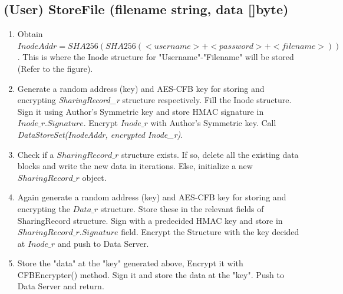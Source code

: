 \documentclass[a4paper, 12pt]{scrartcl}
\begin{document}
\subsection{(User) StoreFile (filename string, data []byte)}
\begin{enumerate}
	\itemsep0em
	\item Obtain $InodeAddr = SHA256 ( SHA256(<username>+<password>+<filename>) )$. This is where the Inode structure for "Username"-"Filename" will be stored (Refer to the figure).
	\item Generate a random address (key) and AES-CFB key for storing and encrypting \textit{SharingRecord\_r} structure respectively. Fill the Inode structure. Sign it using Author's Symmetric key and store HMAC signature in $Inode\_r.Signature$. Encrypt $Inode\_r$ with Author's Symmetric key. Call \textit{DataStoreSet(InodeAddr, encrypted Inode\_r)}.
	\item Check if a $SharingRecord\_r$ structure exists. If so, delete all the existing data blocks and write the new data in iterations. Else, initialize a new $SharingRecord\_r$ object.
	\item Again generate a random address (key) and AES-CFB key for storing and encrypting the $Data\_r$ structure. Store these in the relevant fields of SharingRecord structure. Sign with a predecided HMAC key and store in $SharingRecord\_r.Signature$ field. Encrypt the Structure with the key decided at $Inode\_r$ and push to Data Server.
	\item Store the "data" at the "key" generated above, Encrypt it with CFBEncrypter() method. Sign it and store the data at the "key". Push to Data Server and return. 
\end{enumerate}
\end{document}
